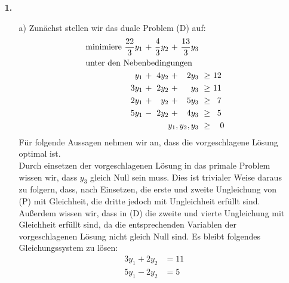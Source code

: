 \documentclass [a4paper,11pt]{article}
\author{\authorinfotitle}
\title{\titleinfo}
\date{\today}
\begin{document}
\maketitle
    \begin{enumerate}
        \item[\textbf{1.}]
            \begin{enumerate}
                \item[a)]
                    Zunächst stellen wir das duale Problem (D) auf:
                    \begin{align*}
                    \begin{alignedat}{6}
                    & \text{minimiere } & \frac{22}{3}y_1 &\ + &\ \frac{4}{3}y_2 &\ + &\ \frac{13}{3}y_3 & & \\
                    & \rlap{unter den Nebenbedingungen} & & & & & & & \\
                    &&  y_1 &\ + &\ 4y_2 &\ + &\ 2y_3 &\ \geq &\ 12\ \\
                    && 3y_1 &\ + &\ 2y_2 &\ + &\  y_3 &\ \geq &\ 11\ \\
                    && 2y_1 &\ + &\  y_2 &\ + &\ 5y_3 &\ \geq &\  7\ \\
                    && 5y_1 &\ - &\ 2y_2 &\ + &\ 4y_3 &\ \geq &\  5\ \\
                    && & & & & \llap{$y_1,y_2,y_3$} &\ \geq &\ 0
                    \end{alignedat}
                    \end{align*}
                    Für folgende Aussagen nehmen wir an, dass die vorgeschlagene Lösung optimal ist.\\
                    Durch einsetzen der vorgeschlagenen Lösung in das primale Problem wissen wir, dass $y_3$ gleich Null sein muss. Dies ist trivialer Weise
                    daraus zu folgern, dass, nach Einsetzen, die erste und zweite Ungleichung von (P) mit Gleichheit, die dritte jedoch mit Ungleichheit erfüllt
                    sind. Außerdem wissen wir, dass in (D) die zweite und vierte Ungleichung mit Gleichheit erfüllt sind, da die entsprechenden Variablen der
                    vorgeschlagenen Lösung nicht gleich Null sind. Es bleibt folgendes Gleichungssystem zu lösen:
                    \begin{align*}
                    3y_1 + 2y_2 &= 11\ \\
                    5y_1 - 2y_2 &= 5\
                    \end{align*}

\end{enumerate}
\end{enumerate}
\end{document}
